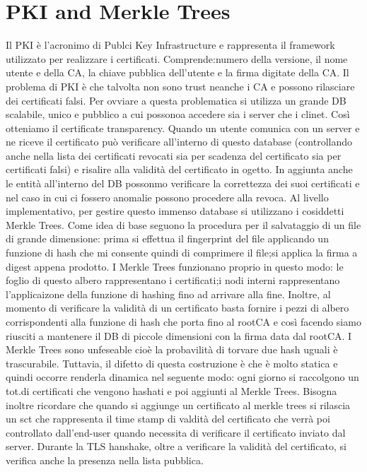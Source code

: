 \documentclass[a4paper,draft]{article}
\begin{document}
\section{PKI and Merkle Trees}
Il PKI è l'acronimo di Publci Key Infrastructure e rappresenta il framework utilizzato per realizzare i certificati\@. Comprende:\@il numero della versione, il nome utente e della CA, la chiave pubblica dell'utente e la firma digitate della CA\@. Il problema di PKI è che talvolta non sono trust neanche i CA e possono rilasciare dei certificati falsi\@.\newline
Per ovviare a questa problematica si utilizza un grande DB scalabile, unico e pubblico a cui possonoa accedere sia i server che i clinet\@. Così otteniamo il certificate transparency\@. Quando un utente comunica con un server e ne riceve il certificato può verificare all'interno di questo database (controllando anche nella lista dei certificati revocati sia per scadenza del certificato sia per certificati falsi) e risalire alla validità del certificato in ogetto\@.
In aggiunta anche le entità all'interno del DB possonmo verificare la correttezza dei suoi certificati e nel caso in cui ci fossero anomalie possono procedere alla revoca\@.\newline
Al livello implementativo, per gestire questo immenso database si utilizzano i cosiddetti Merkle Trees\@. Come idea di base seguono la procedura per il salvataggio di un file di grande dimensione: prima si effettua il fingerprint del file applicando un funzione di hash che mi consente quindi di comprimere il file;\@poi si applica la firma a digest appena prodotto\@.\newline
I Merkle Trees funzionano proprio in questo modo: le foglio di questo albero rappresentano i certificati;\@mentre i nodi interni rappresentano l'applicaizone della funzione di hashing fino ad arrivare alla fine\@. Inoltre, al momento di verificare la validità di un certificato basta fornire i pezzi di albero corrispondenti alla funzione di hash che porta fino al rootCA e così facendo siamo riusciti a mantenere il DB di piccole dimensioni con la firma data dal rootCA\@. I Merkle Trees sono unfeseable cioè la probavilità di torvare due hash uguali è trascurabile\@.\newline
Tuttavia, il difetto di questa costruzione è che è molto statica e quindi occorre renderla dinamica nel seguente modo: ogni giorno si raccolgono un tot.di certificati che vengono hashati e poi aggiunti al Merkle Trees\@. Bisogna inoltre ricordare che quando si aggiunge un certificato al merkle trees si rilascia un sct che rappresenta il time stamp di valdità del certificato che verrà poi controllato dall'end-user quando necessita di verificare il certificato inviato dal server\@. Durante la TLS hanshake, oltre a verificare la validità del certificato, si verifica anche la presenza nella lista pubblica\@.
\end{document}

